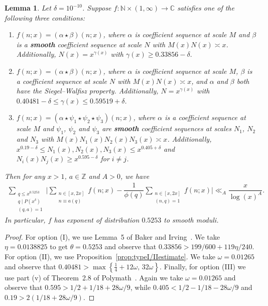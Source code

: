 \documentclass{amsart}
\newtheorem{lemma}{Lemma}
\numberwithin{equation}{section}
\begin{document}
 \begin{lemma} \label{lem:typei/ii/ii}
Let $\delta = 10^{-10}$. Suppose $f: \mathbb{N} \times (1,\infty) \rightarrow \mathbb{C}$  satisfies  one of the following three conditions:  
\begin{enumerate} 
\item[{\rm (I)}]  $f(n;x) = (\alpha \star \beta)(n;x)$, where $\alpha$ is  coefficient sequence at scale $M$ and $\beta$ is a \textbf{smooth} coefficient sequence at scale $N$ with $M(x) N(x) \asymp x$. Additionally, $N(x) = x^{\gamma(x)}$ with $
\gamma(x) \geq  0.33856-\delta.
$
\item[{\rm (II)}]  $f(n;x) = (\alpha \star \beta)(n;x)$, where $\alpha$ is  coefficient sequence at scale $M$, $\beta$ is a  coefficient sequence at scale $N$ with $M(x) N(x) \asymp x$, and $\alpha$ and $\beta$ both have the Siegel--Walfisz property.   Additionally, $N = x^{\gamma(x)}$ with 
$0.40481 -\delta \leq \gamma(x) \leq  0.59519+\delta$. 
\item[{\rm (III)}] $f(n;x) = (\alpha \star \psi_1 \star \psi_2 \star \psi_3)(n;x)$, where $\alpha$ is a coefficient sequence at scale $M$ and $\psi_1$, $\psi_2$ and $\psi_3$ are  \textbf{smooth} coefficient sequences at scales $N_1$, $N_2$ and $N_3$ with $M(x) N_1(x) N_2(x) N_3(x) \asymp x$.   Additionally, $x^{0.19-\delta} \leq N_1(x), N_2(x), N_3(x) \leq x^{0.405+\delta}$ and $N_i(x)N_j(x) \geq x^{0.595-\delta}$ for $i \neq j$.
\end{enumerate} 
Then for any  $x>1$, $a\in \mathbb{Z}$ and   $A>0$, we have
\begin{align*}
\sum_{\substack{q \leq x^{0.5253 } \\ q \mid P(x^\delta) \\ (q,a)=1}} \Bigg| \sum_{\substack{n \in [x,2x] \\ n \equiv a (q)}} f(n;x) - \dfrac{1}{\phi(q)} \sum_{\substack{ n \in [x,2x] \\ (n,q)=1}}f(n;x) \Bigg| \ll_A \dfrac{x}{\log(x)^A}.
\end{align*}
In particular, $f$ has exponent of distribution $0.5253$ to smooth moduli.
\end{lemma}


\begin{proof}
For option (I), we use Lemma~5 of Baker and Irving~\cite{Baker:2017:BIP}. We take $\eta = 0.0138825$ to get $\theta = 0.5253$ and observe that $0.33856 > 199/600+119 \eta/240$. For option (II), we use Proposition~\ref{prop:typeI/IIestimate}. We take $\omega =0.01265$ and observe that $0.40481  > \max\left\{\frac{1}{4}+12\omega, \, 32\omega \right\}$.  Finally, for option (III) we use part (v) of Theorem~2.8 of Polymath~\cite{Polymath:2014:EDZ}. Again we take $\omega = 0.01265$ and observe that $0.595 > 1/2+1/18+28\omega/9$, while $0.405< 1/2-1/18-28\omega/9$ and $0.19>2(1/18+28\omega/9)$. 
\end{proof}
\end{document}
